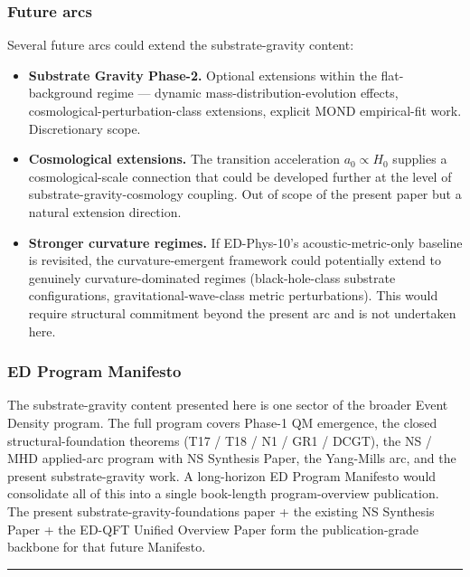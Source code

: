 \documentclass[
]{article}
\providecommand{\tightlist}{%
  \setlength{\itemsep}{0pt}\setlength{\parskip}{0pt}}
\begin{document}
\subsubsection{Future arcs}\label{future-arcs}

Several future arcs could extend the substrate-gravity content:

\begin{itemize}
\tightlist
\item
  \textbf{Substrate Gravity Phase-2.} Optional extensions within the
  flat-background regime --- dynamic mass-distribution-evolution
  effects, cosmological-perturbation-class extensions, explicit MOND
  empirical-fit work. Discretionary scope.
\item
  \textbf{Cosmological extensions.} The transition acceleration
  \(a_0 \propto H_0\) supplies a cosmological-scale connection that
  could be developed further at the level of substrate-gravity-cosmology
  coupling. Out of scope of the present paper but a natural extension
  direction.
\item
  \textbf{Stronger curvature regimes.} If ED-Phys-10's
  acoustic-metric-only baseline is revisited, the curvature-emergent
  framework could potentially extend to genuinely curvature-dominated
  regimes (black-hole-class substrate configurations,
  gravitational-wave-class metric perturbations). This would require
  structural commitment beyond the present arc and is not undertaken
  here.
\end{itemize}

\subsubsection{ED Program Manifesto}\label{ed-program-manifesto}

The substrate-gravity content presented here is one sector of the
broader Event Density program. The full program covers Phase-1 QM
emergence, the closed structural-foundation theorems (T17 / T18 / N1 /
GR1 / DCGT), the NS / MHD applied-arc program with NS Synthesis Paper,
the Yang-Mills arc, and the present substrate-gravity work. A
long-horizon ED Program Manifesto would consolidate all of this into a
single book-length program-overview publication. The present
substrate-gravity-foundations paper + the existing NS Synthesis Paper +
the ED-QFT Unified Overview Paper form the publication-grade backbone
for that future Manifesto.

\begin{center}\rule{0.5\linewidth}{0.5pt}\end{center}
\end{document}
